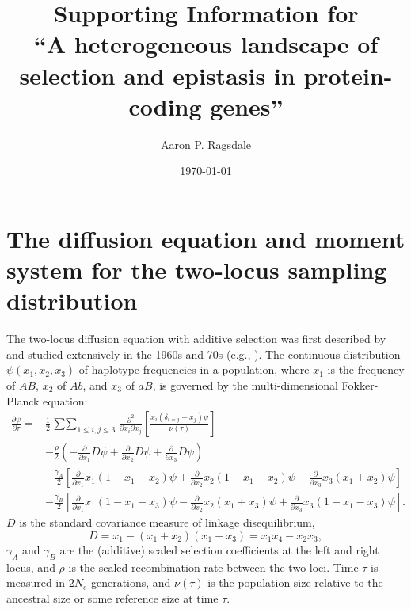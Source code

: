 \documentclass[]{article}
\begin{document}
\title{Supporting Information for\\
``A heterogeneous landscape of selection and epistasis in protein-coding genes''}
\author[]{Aaron P. Ragsdale}
\date{\today}
\maketitle

\renewcommand{\thefigure}{S\arabic{figure}}
\renewcommand{\thetable}{S\arabic{table}}
\renewcommand{\theequation}{S\arabic{equation}}
\renewcommand{\thesection}{S\arabic{section}}
\setcounter{figure}{0}
\setcounter{table}{0}
\setcounter{equation}{0}
\setcounter{section}{0}

\tableofcontents
\newpage

\clearpage

\section{The diffusion equation and moment system for the two-locus sampling distribution}

The two-locus diffusion equation with additive selection was first described by
\citet{Kimura1955-qe} and studied extensively in the 1960s and 70s (e.g.,
\citet{Hill1966-gv,Ohta1969-ie}). The continuous distribution \(\psi(x_1, x_2,
x_3)\) of haplotype frequencies in a population, where \(x_1\) is the frequency
of \(AB\), \(x_2\) of \(Ab\), and \(x_3\) of \(aB\), is governed by the
multi-dimensional Fokker-Planck equation:
\begin{align} \label{eq:diffeq}
\frac{\partial \psi}{\partial \tau} = &
\frac{1}{2}\mathop{\sum\sum}_{1\leq i, j \leq 3}
\frac{\partial^2}{\partial x_i \partial x_j}
\left[\frac{x_i(\delta_{i=j}-x_j)\psi}{\nu(\tau)}\right] \\\nonumber
& -\frac{\rho}{2}\left(-\frac{\partial}{\partial x_1} D\psi
  + \frac{\partial}{\partial x_2} D\psi
  + \frac{\partial}{\partial x_3} D\psi\right) \\\nonumber
& - \frac{\gamma_A}{2}\left[
  \frac{\partial}{\partial x_1} x_1(1-x_1-x_2)\psi
  + \frac{\partial}{\partial x_2} x_2(1-x_1-x_2)\psi
  - \frac{\partial}{\partial x_3} x_3(x_1+x_2)\psi
  \right] \\\nonumber
& -\frac{\gamma_B}{2}\left[
  \frac{\partial}{\partial x_1} x_1(1-x_1-x_3)\psi
  - \frac{\partial}{\partial x_2} x_2(x_1+x_3)\psi
  + \frac{\partial}{\partial x_3} x_3(1-x_1-x_3)\psi
  \right].
\end{align}
\(D\) is the standard covariance measure of linkage disequilibrium, \[D=x_1 -
(x_1+x_2)(x_1+x_3) = x_1 x_4 - x_2 x_3,\] \(\gamma_A\) and \(\gamma_B\) are the
(additive) scaled selection coefficients at the left and right locus, and
\(\rho\) is the scaled recombination rate between the two loci. Time \(\tau\) is
measured in \(2N_e\) generations, and \(\nu(\tau)\) is the population size relative
to the ancestral size or some reference size at time \(\tau\).
\end{document}
